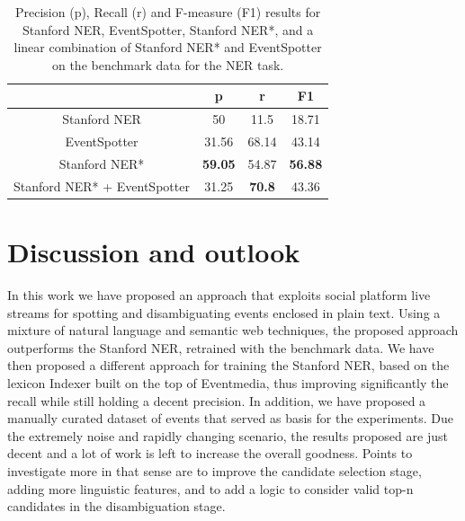 \documentclass[10pt,a4paper]{article}
\begin{document}
\begin{table}[h]
\centering %
\begin{tabular}{c c c c} %
\hline %
& p & r & F1 \\ [0.5ex] %
\hline\hline %
Stanford NER & 50 & 11.5 & 18.71 \\
EventSpotter & 31.56 & 68.14 & 43.14 \\
\hline
Stanford NER* & \textbf{59.05} & 54.87 & \textbf{56.88} \\
Stanford NER* + EventSpotter & 31.25 & \textbf{70.8} & 43.36 \\
\hline %
\end{tabular}
\caption{Precision (p), Recall (r) and F-measure (F1) results for Stanford NER, EventSpotter, Stanford NER*, and a linear combination of Stanford NER* and EventSpotter on the benchmark data for the NER task.} %
\label{tab:manual} %
\end{table}

\section{Discussion and outlook}
In this work we have proposed an approach that exploits social platform live streams for spotting and disambiguating events enclosed in plain text. Using a mixture of natural language and semantic web techniques, the proposed approach outperforms the Stanford NER, retrained with the benchmark data. We have then proposed a different approach for training the Stanford NER, based on the lexicon Indexer built on the top of Eventmedia, thus improving significantly the recall while still holding a decent precision. In addition, we have proposed a manually curated dataset of events that served as basis for the experiments. Due the extremely noise and rapidly changing scenario, the results proposed are just decent and a lot of work is left to increase the overall goodness. Points to investigate more in that sense are to improve the candidate selection stage, adding more linguistic features, and to add a logic to consider valid top-n candidates in the disambiguation stage.
\end{document}
